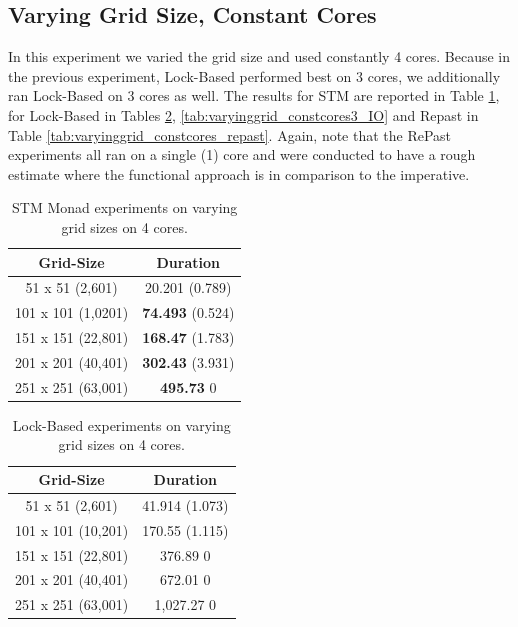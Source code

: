 \subsection{Varying Grid Size, Constant Cores}
In this experiment we varied the grid size and used constantly 4 cores. Because in the previous experiment, Lock-Based performed best on 3 cores, we additionally ran Lock-Based on 3 cores as well. The results for STM are reported in Table \ref{tab:varyinggrid_constcores_stm}, for Lock-Based in Tables \ref{tab:varyinggrid_constcores4_IO}, \ref{tab:varyinggrid_constcores3_IO} and Repast in Table \ref{tab:varyinggrid_constcores_repast}. Again, note that the RePast experiments all ran on a single (1) core and were conducted to have a rough estimate where the functional approach is in comparison to the imperative.

\begin{table}
	\centering
  	\begin{tabular}{ c || c }
        Grid-Size          & Duration                \\ \hline \hline 
   		51 x 51 (2,601)    & 20.201          (0.789) \\ \hline
   		101 x 101 (1,0201) & \textbf{74.493} (0.524) \\ \hline
   		151 x 151 (22,801) & \textbf{168.47} (1.783) \\ \hline
   		201 x 201 (40,401) & \textbf{302.43} (3.931) \\ \hline
   		251 x 251 (63,001) & \textbf{495.73} 0
  	\end{tabular}

  	\caption{STM Monad experiments on varying grid sizes on 4 cores.}
	\label{tab:varyinggrid_constcores_stm}
\end{table}


\begin{table}
	\centering
  	\begin{tabular}{ c || c }
        Grid-Size          & Duration 		\\ \hline \hline 
   		51 x 51 (2,601)    & 41.914 (1.073) \\ \hline
   		101 x 101 (10,201) & 170.55 (1.115) \\ \hline
   		151 x 151 (22,801) & 376.89 0 		\\ \hline
   		201 x 201 (40,401) & 672.01 0 		\\ \hline 
   		251 x 251 (63,001) & 1,027.27 0
  	\end{tabular}
  	
  	\caption{Lock-Based experiments on varying grid sizes on 4 cores.}
	\label{tab:varyinggrid_constcores4_IO}
\end{table}

